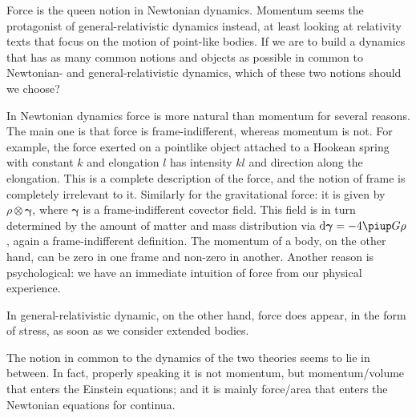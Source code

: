 \documentclass[\ifafour a4paper,12pt,\else a5paper,10pt,\fi%
onecolumn,oneside,article,%
british%
]{memoir}
\theoremstyle{remark}
\theoremstyle{innote}
\newcommand*{\pu}{\piup}%
\newcommand*{\di}{\mathrm{d}}%
\renewcommand*{\|}[1][]{\nonscript\,#1\vert\nonscript\;\mathopen{}}
\newcommand*{\yffg}{\gamma}
\newcommand*{\yfg}{\bm{\yffg}}
\begin{document}
Force is the queen notion in Newtonian dynamics. Momentum seems the
protagonist of general-relativistic dynamics instead, at least looking at
relativity texts that focus on the motion of point-like bodies. If we are
to build a dynamics that has as many common notions and objects as possible
in common to Newtonian- and general-relativistic dynamics, which of these
two notions should we choose?

In Newtonian dynamics force is more natural than momentum for several
reasons. The main one is that force is frame-indifferent, whereas momentum
is not. For example, the force exerted on a pointlike object attached to a
Hookean spring with constant $k$ and elongation $l$ has intensity $kl$ and
direction along the elongation. This is a complete description of the
force, and the notion of frame is completely irrelevant to it. Similarly
for the gravitational force: it is given by $\rho\otimes\yfg$, where $\yfg$
is a frame-indifferent covector field. This field is in turn determined by
the amount of matter and mass distribution via $\di\yfg = - 4\pu G \rho$,
again a frame-indifferent definition. The momentum of a body, on the other
hand, can be zero in one frame and non-zero in another. Another reason is
psychological: we have an immediate intuition of force from our physical
experience.

In general-relativistic dynamic, on the other hand, force does appear, in
the form of stress, as soon as we consider extended bodies.

The notion in common to the dynamics of the two theories seems to lie in
between. In fact, properly speaking it is not momentum, but momentum/volume
that enters the Einstein equations; and it is mainly force/area that enters
the Newtonian equations for continua.
\end{document}
